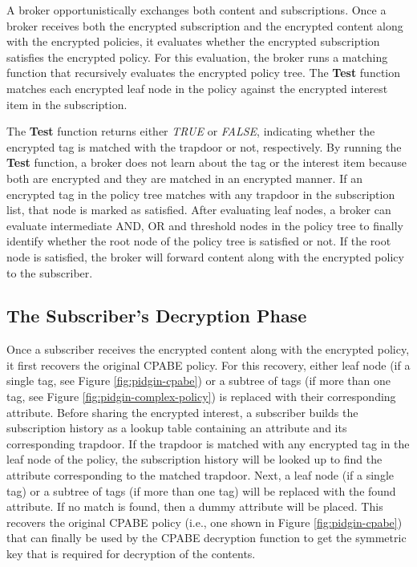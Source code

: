 \documentclass[epsfig,a4paper,11pt,titlepage]{book}
\numberwithin{algorithm}{chapter}
\begin{document}
A broker opportunistically exchanges both content and subscriptions. Once a broker receives both the encrypted subscription and the encrypted content along with the encrypted policies, it evaluates whether the encrypted subscription satisfies the encrypted policy. For this evaluation, the broker runs a matching function that recursively evaluates the encrypted policy tree. The \textbf{Test} function matches each encrypted leaf node in the policy against the encrypted interest item in the subscription.

The \textbf{Test} function returns either \emph{TRUE} or \emph{FALSE}, indicating whether the encrypted tag is matched with the trapdoor or not, respectively. By running the \textbf{Test} function, a broker does not learn about the tag or the interest item because both are encrypted and they are matched in an encrypted manner. If an encrypted tag in the policy tree matches with any trapdoor in the subscription list, that node is marked as satisfied. After evaluating leaf nodes, a broker can evaluate intermediate AND, OR and threshold nodes in the policy tree to finally identify whether the root node of the policy tree is satisfied or not. If the root node is satisfied, the broker will forward content along with the encrypted policy to the subscriber.

\subsection{The Subscriber's Decryption Phase}
Once a subscriber receives the encrypted content along with the encrypted policy, it first recovers the original \gls{CPABE} policy. 
For this recovery, either leaf node (if a single tag, see Figure \ref{fig:pidgin-cpabe}) or a subtree of tags (if more than one tag, see Figure \ref{fig:pidgin-complex-policy}) is replaced with their corresponding attribute. Before sharing the encrypted interest, a subscriber builds the subscription history as a lookup table containing an attribute and its corresponding trapdoor. If the trapdoor is matched with any encrypted tag in the leaf node of the policy, the subscription history will be looked up to find the attribute corresponding to the matched trapdoor. Next, a leaf node (if a single tag) or a subtree of tags (if more than one tag) will be replaced with the found attribute. If no match is found, then a dummy attribute will be placed. This recovers the original \gls{CPABE} policy (i.e., one shown in Figure \ref{fig:pidgin-cpabe}) that can finally be used by the \gls{CPABE} decryption function to get the symmetric key that is required for decryption of the contents.
\end{document}
